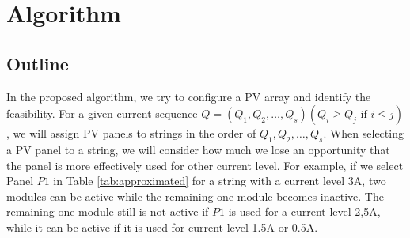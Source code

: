 \documentclass[conference]{IEEEtran}
\begin{document}
\section{Algorithm}\label{Sec5}


\subsection{Outline}

In the proposed algorithm, we try to configure a PV array and identify the feasibility. For a given current sequence $Q = (Q_{1},Q_{2},\ldots ,Q_{s}) (Q_{i} \geq Q_{j} \mbox{\ if\ } i \leq j)$, we will assign PV panels to strings in the order of $Q_{1},Q_{2},\ldots ,Q_{s}$. When selecting a PV panel to a string, we will consider how much we lose an opportunity that the panel is more effectively used for other current level. For example, if we select Panel $P1$ in Table \ref{tab:approximated} for a string with a current level 3A, two modules can be active while the remaining one module becomes inactive. 
The remaining one module still is not active if $P1$ is used for a current level 2,5A, while it can be active if it is used for current level 1.5A or 0.5A. 
\end{document}
